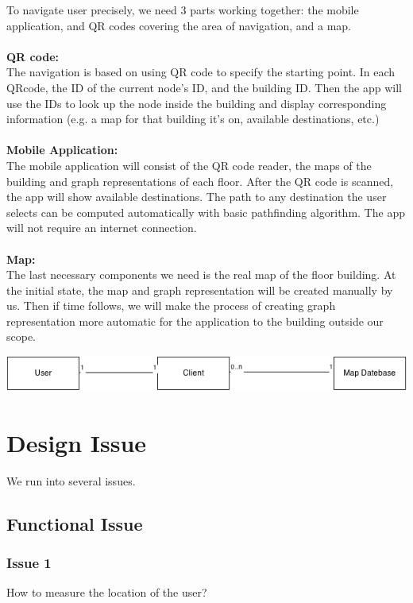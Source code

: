 \documentclass[12pt]{article}
\begin{document}
To navigate user precisely, we need 3 parts working together: the mobile application, and QR codes covering the area of navigation, and a map.
\\ \\
\textbf{QR code:}
\\
The navigation is based on using QR code to specify the starting point. In each QRcode, the ID of the current node’s ID, and the building ID. Then the app will use the IDs to look up the node inside the building and display corresponding information (e.g. a map for that building it’s on, available destinations, etc.)
\\ \\
\textbf{Mobile Application:}
\\
The mobile application will consist of the QR code reader, the maps of the building and graph representations of each floor. After the QR code is scanned, the app will show available destinations. The path to any destination the user selects can be computed automatically with basic pathfinding algorithm. The app will not require an internet connection. 
\\ \\
\textbf{Map:}
\\
The last necessary components we need is the real map of the floor building. At the initial state, the map and graph representation will be created manually by us. Then if time follows, we will make the process of creating graph representation more automatic for the application to the building outside our scope.


\begin{center}
\includegraphics[scale=0.8]{image/user_outline.png}
\end{center}



\section{Design Issue}

We run into several issues.

\subsection{Functional Issue}

\subsubsection{Issue 1}
How to measure the location of the user? \\ \\
\end{document}
